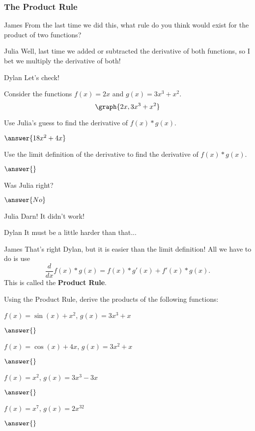 \documentclass{ximera}
\begin{document}
\subsubsection{The Product Rule}
\begin{dialogue}
\item[James] From the last time we did this, what rule do you think would exist for the product of two functions?
\item[Julia] Well, last time we added or subtracted the derivative of both functions, so I bet we multiply the derivative of both!
\item[Dylan] Let's check!
\end{dialogue}
Consider the functions $f(x) = 2x$ and $g(x) = 3x^3 + x^2$.
\[
\graph{2x, 3x^3+x^2}
\]
\begin{question}
Use Julia's guess to find the derivative of $f(x) * g(x)$.

$\answer{18x^2+4x}$

Use the limit definition of the derivative to find the derivative of $f(x) * g(x)$.

$\answer{}$

Was Julia right?

$\answer{No}$
\end{question}
\begin{dialogue}
\item[Julia] Darn! It didn't work!
\item[Dylan] It must be a little harder than that...
\item[James] That's right Dylan, but it is easier than the limit definition! All we have to do is use $$\frac{d}{dx} f(x)*g(x) = f(x)*g'(x) + f'(x)*g(x)\text{.}$$ This is called the \textbf{Product Rule}.
\end{dialogue}
\begin{question}
Using the Product Rule, derive the products of the following functions:

$f(x) = \sin(x)+x^2$, $g(x) = 3x^3+x$

$\answer{}$

$f(x) = \cos(x)+4x$, $g(x) = 3x^2+x$

$\answer{}$

$f(x) = x^2$, $g(x) = 3x^3-3x$

$\answer{}$

$f(x) = x^7$, $g(x) = 2x^{32}$

$\answer{}$

\end{question}
\end{document}
